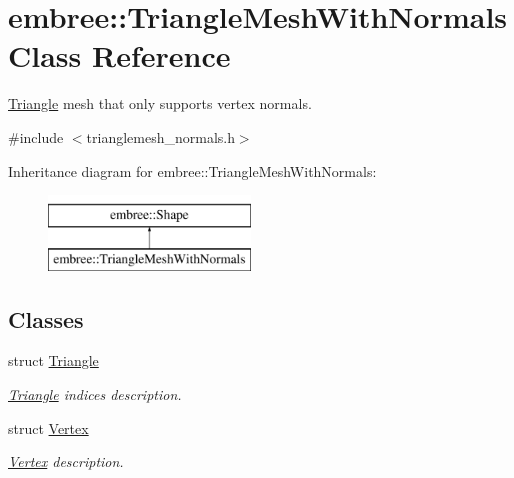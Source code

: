 \hypertarget{classembree_1_1_triangle_mesh_with_normals}{
\section{embree::TriangleMeshWithNormals Class Reference}
\label{classembree_1_1_triangle_mesh_with_normals}
}


\hyperlink{structembree_1_1_triangle_mesh_with_normals_1_1_triangle}{Triangle} mesh that only supports vertex normals.  




{\ttfamily \#include $<$trianglemesh\_\-normals.h$>$}

Inheritance diagram for embree::TriangleMeshWithNormals:\begin{figure}[H]
\begin{center}
\leavevmode
\includegraphics[height=2.000000cm]{classembree_1_1_triangle_mesh_with_normals}
\end{center}
\end{figure}
\subsection*{Classes}
\begin{DoxyCompactItemize}
\item 
struct \hyperlink{structembree_1_1_triangle_mesh_with_normals_1_1_triangle}{Triangle}
\begin{DoxyCompactList}\small\item\em \hyperlink{structembree_1_1_triangle_mesh_with_normals_1_1_triangle}{Triangle} indices description. \item\end{DoxyCompactList}\item 
struct \hyperlink{structembree_1_1_triangle_mesh_with_normals_1_1_vertex}{Vertex}
\begin{DoxyCompactList}\small\item\em \hyperlink{structembree_1_1_triangle_mesh_with_normals_1_1_vertex}{Vertex} description. \item\end{DoxyCompactList}\end{DoxyCompactItemize}
